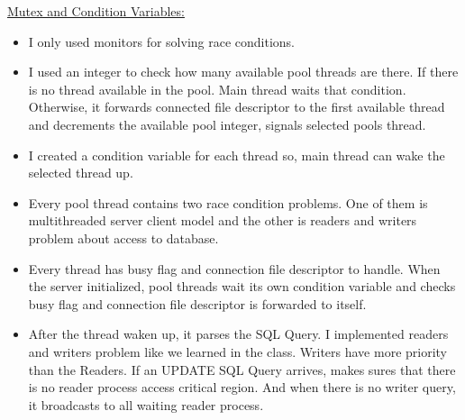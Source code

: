 \documentclass[12pt]{article}
\renewcommand{\_}{\kern-1.5pt\textunderscore\kern-1.5pt}
\begin{document}
\vspace{\baselineskip}

\vspace{\baselineskip}

\vspace{\baselineskip}

\vspace{\baselineskip}

\vspace{\baselineskip}
\setlength{\parskip}{0.0pt}
\begin{justify}
{\fontsize{14pt}{16.8pt}\selectfont \uline{Mutex and Condition Variables:}}
\end{justify}
\begin{itemize}
	\item I only used monitors for solving race conditions.
\end{itemize}

\vspace{\baselineskip}
\begin{itemize}
	\item I used an integer to check how many available pool threads are there. If there is no thread available in the pool. Main thread waits that condition. Otherwise, it forwards connected file descriptor to the first available thread and decrements the available pool integer, signals selected pools thread.

\vspace{\baselineskip}
	\item I created a condition variable for each thread so, main thread can wake the selected thread up.

\vspace{\baselineskip}
	\item Every pool thread contains two race condition problems. One of them is multithreaded server client model and the other is readers and writers problem about access to database.

\vspace{\baselineskip}
	\item Every thread has busy flag and connection file descriptor to handle. When the server initialized, pool threads wait its own condition variable and checks busy flag and connection file descriptor is forwarded to itself.
\end{itemize}

\vspace{\baselineskip}
\begin{itemize}
	\item After the thread waken up, it parses the SQL Query. I implemented readers and writers problem like we learned in the class. Writers have more priority than the Readers. If an UPDATE SQL Query arrives, makes sures that there is no reader process access critical region. And when there is no writer query, it broadcasts to all waiting reader process.
\end{itemize}
\end{document}
